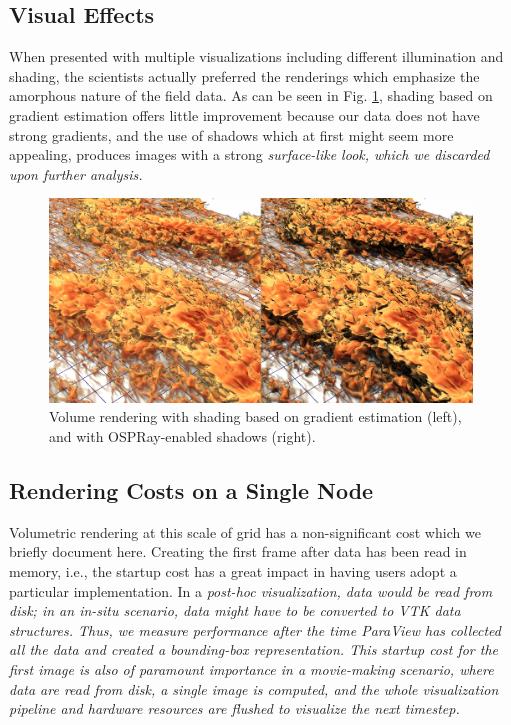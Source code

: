 \documentclass[5p,times]{elsarticle}
\begin{document}
\subsection{Visual Effects}

When presented with multiple visualizations including different illumination and
shading, the scientists actually preferred the renderings which emphasize the
amorphous nature of the field data. As can be seen in Fig. \ref{fig:shadings},
shading based on gradient estimation offers little improvement because our data
does not have strong gradients, and the use of shadows which at first might seem
more appealing, produces images with a strong \it{surface-like} \rm look, which
we discarded upon further analysis.

\begin{figure}
	\centering
	\includegraphics[width=\linewidth]{fig2montage}%
	\caption{\label{fig:shadings} Volume rendering with shading based on gradient
estimation (left), and with OSPRay-enabled shadows (right).}
\end{figure}


\subsection{Rendering Costs on a Single Node}

Volumetric rendering at this scale of grid has a non-significant cost which we
briefly document here. Creating the first frame after data has been read in memory,
 i.e., the startup cost has a great impact in having users adopt a particular implementation.
In a \it{post-hoc} \rm visualization, data would be read from disk; in an \it{in-situ} \rm
scenario, data might have to be converted to VTK data structures. Thus, we measure performance
after the time ParaView has collected all the data and created a bounding-box representation.
This startup cost for the first image is also of paramount importance in a movie-making scenario,
where data are read from disk, a single image is computed, and the whole visualization pipeline
and hardware resources are flushed to visualize the next timestep.
\end{document}
